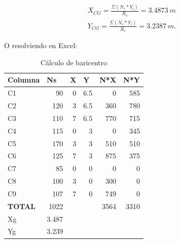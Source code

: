 \documentclass[../main.tex]{subfiles}
\begin{document}
\begin{align*}
  X_{CG} = \frac{\Sigma (N_s * Y_i)}{R_s} = \SI{3.4873}{m} \\[5pt]
  Y_{CG} = \frac{\Sigma (N_s * Y_i)}{R_s} = \SI{3.2387}{m}
.\end{align*}

O resolviendo en Excel:

\begin{table}[htbp]
  \centering
  \caption{Cálculo de baricentro}
    \begin{tabular}{|l|r|rrrr}
    \hline
    \rowcolor[rgb]{ .851,  .851,  .851} \textbf{Columna} & \multicolumn{1}{l|}{\textbf{Ns}} & \multicolumn{1}{l|}{\textbf{X}} & \multicolumn{1}{l|}{\textbf{Y}} & \multicolumn{1}{l|}{\textbf{N*X}} & \multicolumn{1}{l|}{\textbf{N*Y}} \bigstrut\\
    \hline
    C1    & 90    & \multicolumn{1}{r|}{0} & \multicolumn{1}{r|}{6.5} & \multicolumn{1}{r|}{0} & \multicolumn{1}{r|}{585} \bigstrut\\
    \hline
    C2    & 120   & \multicolumn{1}{r|}{3} & \multicolumn{1}{r|}{6.5} & \multicolumn{1}{r|}{360} & \multicolumn{1}{r|}{780} \bigstrut\\
    \hline
    C3    & 110   & \multicolumn{1}{r|}{7} & \multicolumn{1}{r|}{6.5} & \multicolumn{1}{r|}{770} & \multicolumn{1}{r|}{715} \bigstrut\\
    \hline
    C4    & 115   & \multicolumn{1}{r|}{0} & \multicolumn{1}{r|}{3} & \multicolumn{1}{r|}{0} & \multicolumn{1}{r|}{345} \bigstrut\\
    \hline
    C5    & 170   & \multicolumn{1}{r|}{3} & \multicolumn{1}{r|}{3} & \multicolumn{1}{r|}{510} & \multicolumn{1}{r|}{510} \bigstrut\\
    \hline
    C6    & 125   & \multicolumn{1}{r|}{7} & \multicolumn{1}{r|}{3} & \multicolumn{1}{r|}{875} & \multicolumn{1}{r|}{375} \bigstrut\\
    \hline
    C7    & 85    & \multicolumn{1}{r|}{0} & \multicolumn{1}{r|}{0} & \multicolumn{1}{r|}{0} & \multicolumn{1}{r|}{0} \bigstrut\\
    \hline
    C8    & 100   & \multicolumn{1}{r|}{3} & \multicolumn{1}{r|}{0} & \multicolumn{1}{r|}{300} & \multicolumn{1}{r|}{0} \bigstrut\\
    \hline
    C9    & 107   & \multicolumn{1}{r|}{7} & \multicolumn{1}{r|}{0} & \multicolumn{1}{r|}{749} & \multicolumn{1}{r|}{0} \bigstrut\\
    \hline
    \textbf{TOTAL} & 1022  &       & \multicolumn{1}{r|}{} & \multicolumn{1}{r|}{3564} & \multicolumn{1}{r|}{3310} \bigstrut\\
\cline{1-2}\cline{5-6}    Xg    & 3.487 &       &       &       &  \bigstrut\\
\cline{1-2}    Yg    & 3.239 &       &       &       &  \bigstrut\\
\cline{1-2}    \end{tabular}%
  \label{tab:addlabel}%
\end{table}%
\end{document}
